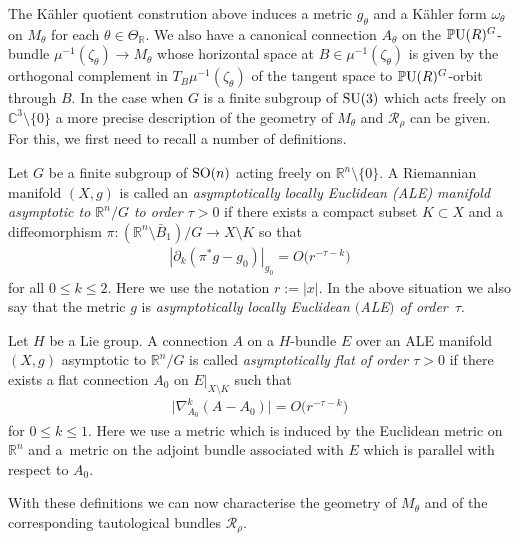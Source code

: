 \documentclass[pdftex]{sigma}
\numberwithin{equation}{section}
\newcommand{\cR}{\mathcal{R}}
\newcommand{\R}{{\mathbb R}}
\newcommand{\C}{{\mathbb C}}
\newcommand{\SO}{{\rm SO}}
\newcommand{\SU}{{\rm SU}}
\newcommand{\PU}{{\mathbb P}{\rm U}}
\newcommand{\del}{\partial}
\begin{document}
The K\"ahler quotient constrution above induces a metric $g_{\theta}$
and a K\"ahler form $\omega_{\theta}$ on $M_{\theta}$ for each $\theta
\in \Theta_\R$.  We also have a canonical connection $A_{\theta}$ on
the $\PU(R)^G$-bundle $\mu^{-1}(\zeta_\theta)\to M_\theta$ whose
horizontal space at $B\in\mu^{-1}(\zeta_\theta)$ is given by the
orthogonal complement in $T_B\mu^{-1}(\zeta_\theta)$ of the
tangent space to $\PU(R)^G$-orbit through $B$.  In the case when $G$
is a f\/inite subgroup of $\SU(3)$ which acts freely on $\C^3{\setminus}
\{0\}$ a more precise description of the geometry of $M_{\theta}$ and
$\cR_{\rho}$ can be given.  For this, we f\/irst need to recall a number
of def\/initions.

\begin{Definition}\label{def:ale}
  Let $G$ be a f\/inite subgroup of $\SO(n)$ acting freely on
  $\R^n{\setminus} \{0\}$.  A Riemannian manifold $(X,g)$ is called an
  \emph{asymptotically locally Euclidean (ALE) manifold asymptotic to
    $\R^n/G$ to order $\tau >0$} if there exists a compact subset $K
  \subset X$ and a dif\/feomorphism $\pi\colon (\R^n {\setminus} \bar
  B_1)/G \to X{\setminus} K$ so that
  \begin{gather*}
    |\del_k (\pi^*g-g_0)|_{g_0}=O\big(r^{-\tau-k}\big)
  \end{gather*}
  for all $0 \leq k \leq 2$.  Here we use the notation $r:=|x|$. In
  the above situation we also say that the metric $g$ is
  \emph{asymptotically locally Euclidean $($ALE$)$ of order~$\tau$}.
\end{Definition}

\begin{Definition}\label{def:afc}
  Let $H$ be a Lie group.  A connection $A$ on a $H$-bundle $E$ over
  an ALE manifold $(X,g)$ asymptotic to $\R^n/G$ is called
  \emph{asymptotically flat of order $\tau >0$} if there exists a f\/lat
  connection $A_0$ on $E|_{X{\setminus} K}$ such that
  \begin{gather*}
    \big|\nabla_{A_0}^k (A-A_0)\big| = O\big(r^{-\tau-k}\big)
  \end{gather*}
  for $0 \leq k \leq 1$.  Here we use a metric which is induced by the
  Euclidean metric on $\R^n$ and a~met\-ric on the adjoint bundle
  associated with $E$ which is parallel with respect to $A_0$.
\end{Definition}

With these def\/initions we can now characterise the geometry of
$M_{\theta}$ and of the corresponding tautological bundles
$\cR_{\rho}$.
\end{document}
